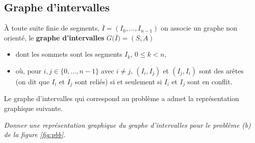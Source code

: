 \subsection{Graphe d'intervalles}
À toute suite finie de segments, $\overline{I}=(I_0,\dots,I_{n-1})$ on associe un graphe non orienté, le {\bf graphe d'intervalles} $G\bigl(\overline I\bigr)=(S, A)$
\begin{itemize}
\item dont les sommets sont les segments $I_k$, $0\le k< n$,
\item où, pour $i,j\in \{0,\dots,n-1\}$ avec $i\ne j$, $(I_i, I_j)$ et $(I_j, I_i)$ sont des arêtes (on dit que $I_i$ et $I_j$ sont reliés) si et seulement si $I_i$ et $I_j$ sont en conflit.
\end{itemize}
Le graphe d'intervalles qui correspond au problème a admet la représentation graphique suivante.
\begin{center}
\end{center} 
\begin{Exercise}\it
Donner une représentation graphique du graphe d'intervalles pour le problème (b) de la figure \ref{fig:pbb}.
\end{Exercise}  
\begin{Answer}
\begin{center}
\end{center} 
\end{Answer}
